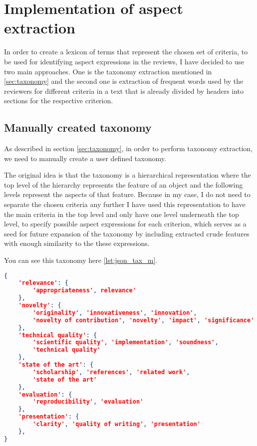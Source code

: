 \chapter{Implementation of aspect extraction}
In order to create a lexicon of terms that represent the chosen set of criteria, to be used for identifying aspect expressions in the reviews, I have decided to use two main approaches. One is the taxonomy extraction mentioned in \ref{sec:taxonomy} and the second one is extraction of frequent words used by the reviewers for different criteria in a text that is already divided by headers into sections for the respective criterion.
\section{Manually created taxonomy}
As described in section \ref{sec:taxonomy}, in order to perform taxonomy extraction, we need to manually
create a user defined taxonomy. 

The original idea is that the taxonomy is a hierarchical representation where the top level of the hierarchy represents the feature of an object and the following levels represent the aspects of that feature. Because in my case, I do not need to separate the chosen criteria any further I have used this representation to have the main criteria in the top level and only have one level underneath the top level, to specify possible aspect expressions for each criterion, which serves as a seed for future expansion of the taxonomy by including extracted crude features with enough similarity to the these expressions. 

You can see this taxonomy here \ref{lst:json_tax_m}.

\begin{lstlisting}[language=json,firstnumber=1, caption={Manually created taxonomy for aspect extraction},label={lst:json_tax_m},float,floatplacement=H]
{
    'relevance': {
        'appropriateness', relevance'
    },
    'novelty': {
        'originality', 'innovativeness', 'innovation', 
        'novelty of contribution', 'novelty', 'impact', 'significance'
    },
    'technical quality': {
        'scientific quality', 'implementation', 'soundness',
        'technical quality'
    },
    'state of the art': {
        'scholarship', 'references', 'related work', 
        'state of the art'
    },
    'evaluation': {
    	'reproducibility', 'evaluation'
    },
    'presentation': {
    	'clarity', 'quality of writing', 'presentation'
    },
}
\end{lstlisting}
